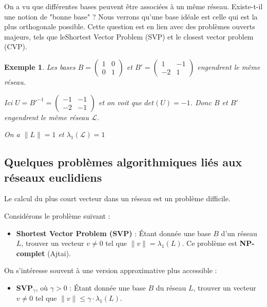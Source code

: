 \documentclass[a4paper,12pt]{report}  %
\theoremstyle{definitionstyle}
\theoremstyle{examplestyle}
\newtheorem{example}{Exemple}[chapter] %
\theoremstyle{remarkstyle}
\theoremstyle{propositionstyle}
\theoremstyle{theoremstyle}
\begin{document}
	
	On a vu que différentes bases peuvent être associées à un même réseau. Existe-t-il une notion de "bonne base" ? Nous verrons qu'une base idéale est celle qui est la plus orthogonale possible. Cette question est en lien avec des problèmes ouverts majeurs, tels que leShortest Vector Problem (SVP) et le closest vector problem 
	 (CVP).
	\begin{example}
		Les bases $B = \left(\begin{array}{rr}1 & 0 \\0 & 1\end{array}\right)$ et $B'=\left(\begin{array}{rr}1 & -1 \\-2 & 1\end{array}\right)$ engendrent le même réseau.
		
		Ici $U = B'^{-1} = \left(\begin{array}{rr}-1 & -1 \\-2 & -1\end{array}\right)$ et on voit que $det(U)=-1$. Donc $B$ et $B'$ engendrent le même réseau $\mathcal{L}$.
		
		On a $\|L\| = 1$ et $\lambda_1( \mathcal{L}) = 1$
	\end{example}
	
	\subsection{Quelques problèmes algorithmiques liés aux réseaux euclidiens}
	
	Le calcul du plus court vecteur dans un réseau est un problème difficile.
	
	Considérons le problème suivant :
	
	\begin{itemize}
		\item \textbf{Shortest Vector Problem (SVP)} : Étant donnée une base $B$ d’un réseau $L$, trouver un vecteur $v \neq 0$ tel que $\|v\| = \lambda_1(L)$. Ce problème est \textbf{NP-complet} (Ajtai).
	\end{itemize}
	
	On s’intéresse souvent à une version approximative plus accessible :
	
	\begin{itemize}
		\item \textbf{SVP$_\gamma$}, où $\gamma > 0$ : Étant donnée une base $B$ du réseau $L$, trouver un vecteur $v \neq 0$ tel que $\|v\| \leq \gamma \cdot \lambda_1(L)$.
	\end{itemize}
	
\end{document}
